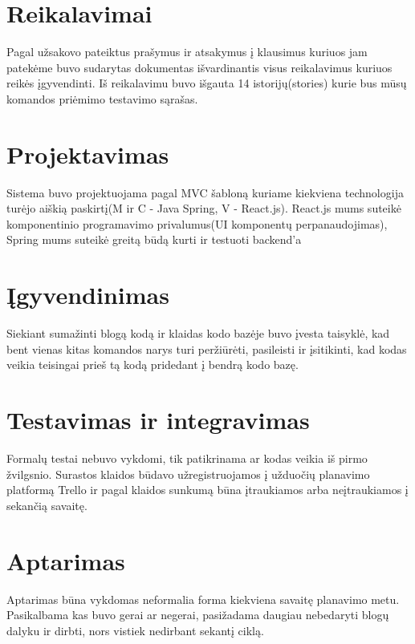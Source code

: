 \documentclass{VUMIFInfKursinis}
\begin{document}
\section{Reikalavimai}
Pagal užsakovo pateiktus prašymus ir atsakymus į klausimus kuriuos jam patekėme buvo sudarytas dokumentas išvardinantis visus reikalavimus kuriuos reikės įgyvendinti. Iš reikalavimu buvo išgauta 14 istorijų(stories) kurie bus mūsų komandos priėmimo testavimo sąrašas.
\section{Projektavimas}
Sistema buvo projektuojama pagal MVC šabloną kuriame kiekviena technologija turėjo aiškią paskirtį(M ir C - Java Spring, V - React.js). React.js mums suteikė komponentinio programavimo privalumus(UI komponentų perpanaudojimas), Spring mums suteikė greitą būdą kurti ir testuoti backend'a
\section{Įgyvendinimas}
Siekiant sumažinti blogą kodą ir klaidas kodo bazėje buvo įvesta taisyklė, kad bent vienas kitas komandos narys turi peržiūrėti, pasileisti ir įsitikinti, kad kodas veikia teisingai prieš tą kodą pridedant į bendrą kodo bazę.
\section{Testavimas ir integravimas}
Formalų testai nebuvo vykdomi, tik patikrinama ar kodas veikia iš pirmo žvilgsnio. Surastos klaidos būdavo užregistruojamos į užduočių planavimo platformą Trello ir pagal klaidos sunkumą būna įtraukiamos arba neįtraukiamos į sekančią savaitę.
\section{Aptarimas}
Aptarimas būna vykdomas neformalia forma kiekviena savaitę planavimo metu. Pasikalbama kas buvo gerai ar negerai, pasižadama daugiau nebedaryti blogų dalyku ir dirbti, nors vistiek nedirbant sekantį ciklą. 
\end{document}
